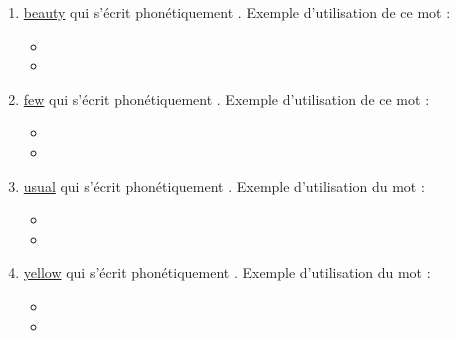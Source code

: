\begin{enumerate}
\item \href{http://www.wordreference.com/enfr/beauty}{beauty} qui s'écrit phonétiquement \href{https://en.oxforddictionaries.com/definition/beauty}{}. Exemple d'utilisation
de ce mot :

\begin{itemize}
\item{}
\item{}
\end{itemize}

\item \href{http://www.wordreference.com/enfr/few}{few} qui s'écrit phonétiquement \href{https://en.oxforddictionaries.com/definition/few}{}. Exemple d'utilisation de ce
mot : 

\begin{itemize}
\item{}
\item{}
\end{itemize}

\item \href{http://www.wordreference.com/enfr/usual}{usual} qui s'écrit phonétiquement \href{https://en.oxforddictionaries.com/definition/usual}{}. Exemple d'utilisation
du mot :

\begin{itemize}
\item{}
\item{}
\end{itemize}

\item \href{http://www.wordreference.com/enfr/yellow}{yellow} qui s'écrit phonétiquement \href{https://en.oxforddictionaries.com/definition/yellow}{}. Exemple d'utilisation
du mot :

\begin{itemize}
\item{}
\item{}
\end{itemize}

\end{enumerate}

